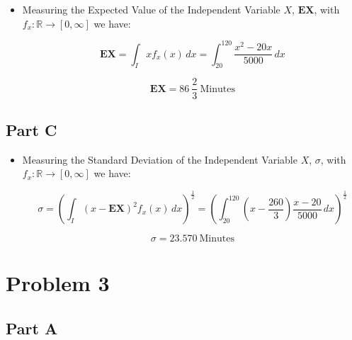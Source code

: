 \documentclass[]{report}
\begin{document}
		\begin{itemize}
			\item Measuring the Expected Value of the Independent Variable $X$, $\mathbf{EX}$, with  $f_{x}: \mathbb{R} \rightarrow [0, \infty]$ we have:
			
			$$ \mathbf{EX} = \int_{I} x f_{x}(x) \, dx =  \int_{20}^{120} \frac{x^2 - 20x}{5000} \, dx $$
			
			$$ \mathbf{EX} = 86 \ \frac{2}{3}  \ \text{Minutes} $$
			
			
		\end{itemize}
	
	\subsection{Part C}
	
		\begin{itemize}
			\item Measuring the Standard Deviation of the Independent Variable $X$, $\sigma$, with  $f_{x}: \mathbb{R} \rightarrow [0, \infty]$ we have:
			
			$$ \sigma = \left( \int_{I} (x - \mathbf{EX})^2  f_{x}(x) \, dx \right)^{\frac{1}{2}} =  \left(\int_{20}^{120} (x - \frac{260}{3}) \frac{x- 20}{5000} \, dx \right)^{\frac{1}{2}}  $$
			
			$$ \sigma = 23.570 \ \text{Minutes} $$
			
			
		\end{itemize}
		
		
		
\section{Problem 3}


	\subsection{Part A}
	
\end{document}
